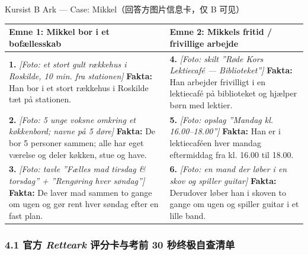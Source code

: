 \begin{emailbox}{Kursist B Ark --- Case: Mikkel（回答方图片信息卡，仅 B 可见）}
\small
\renewcommand{\arraystretch}{1.35}
\begin{tabularx}{\linewidth}{@{} >{\raggedright\arraybackslash}X @{\hspace{0.5cm}} >{\raggedright\arraybackslash}X @{}}
\toprule
\textbf{\color{NCDTeal}Emne 1: Mikkel bor i et bofællesskab} & \textbf{\color{NCDTeal}Emne 2: Mikkels fritid / frivillige arbejde} \\
\midrule
\textbf{1.} \textit{[Foto: et stort gult rækkehus i Roskilde, 10 min. fra stationen]}\newline
\textbf{Fakta:} Han bor i et stort rækkehus i Roskilde tæt på stationen. &
\textbf{4.} \textit{[Foto: skilt ”Røde Kors Lektiecafé --- Biblioteket”]}\newline
\textbf{Fakta:} Han arbejder frivilligt i en lektiecafé på biblioteket og hjælper børn med lektier. \\[4pt]
\midrule
\textbf{2.} \textit{[Foto: 5 unge voksne omkring et køkkenbord; navne på 5 døre]}\newline
\textbf{Fakta:} De bor 5 personer sammen; alle har eget værelse og deler køkken, stue og have. &
\textbf{5.} \textit{[Foto: opslag ”Mandag kl. 16.00--18.00”]}\newline
\textbf{Fakta:} Han er i lektiecaféen hver mandag eftermiddag fra kl. 16.00 til 18.00. \\[4pt]
\midrule
\textbf{3.} \textit{[Foto: tavle ”Fælles mad tirsdag \& torsdag” + ”Rengøring hver søndag”]}\newline
\textbf{Fakta:} De laver mad sammen to gange om ugen og gør rent hver søndag efter en fast plan. &
\textbf{6.} \textit{[Foto: en mand der løber i en skov og spiller guitar]}\newline
\textbf{Fakta:} Derudover løber han i skoven to gange om ugen og spiller guitar i et lille band. \\
\bottomrule
\end{tabularx}
\end{emailbox}

\clearpage
{}

\subsubsection*{4.1 官方 \textit{Retteark} 评分卡与考前 30 秒终极自查清单}

